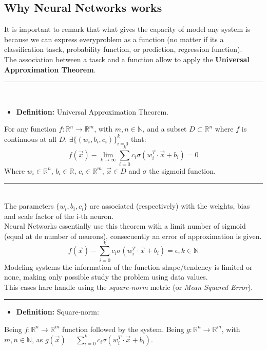 \documentclass[a4paper, 11pt]{article}
\begin{document}
\subsection{Why Neural Networks works}
It is important to remark that what gives the capacity of model any system is because we can express everyproblem as a function (no matter if its a classification tasck, probability function, or prediction, regression function).\\
The association between a tasck and a function allow to apply the \textbf{Universal Approximation Theorem}.\\
\rule{\linewidth}{0.4pt}\\
\begin{itemize}
    \item \textbf{Definition:} Universal Approximation Theorem.
\end{itemize}  
For any function $f:\mathbb{R}^n \rightarrow \mathbb{R}^m$, with $m,n\in\mathbb{N}$, and a subset $D\subset \mathbb{R}^n$ where $f$ is continuous at all $D$, 
$\exists \{(w_i, b_i, c_i)\}_{i = 0}^k$ that: 
$$f(\vec{x}) - \lim_{k \rightarrow \infty} \sum_{i=0}^{k} c_i \sigma \left( w_i^T \cdot \vec{x} + b_i \right) = 0$$
Where $w_i \in \mathbb{R}^n$, $b_i\in \mathbb{R}$, $c_i \in \mathbb{R}^m$, $\vec{x}\in D$ and $\sigma$ the sigmoid function.\\
\rule{\linewidth}{0.4pt}\\\vspace{0.5em}
The parameters $\{w_i, b_i, c_i\}$ are associated (respectively) with the weights, bias and scale factor of the i-th neuron.\\
Neural Networks essentially use this theorem with a limit number of sigmoid (equal at de number of neurons), consecuently an error of approximation is given.
$$f(\vec{x})-\sum_{i=0}^{k} c_i \sigma \left( w_i^T \cdot \vec{x} + b_i \right) = \epsilon, k \in \mathbb{N}$$
Modeling systems the information of the function shape/tendency is limited or none, making only possible study the problem using data values.\\
This cases hare handle using the \textit{square-norm} metric (or \textit{Mean Squared Error}).\\
\rule{\linewidth}{0.4pt}
\begin{itemize}
    \item \textbf{Definition:} Square-norm: 
\end{itemize}
Being $f:\mathbb{R}^n \rightarrow \mathbb{R}^m$ function followed by the system.
Being $g:\mathbb{R}^n \rightarrow \mathbb{R}^m$, with $m,n\in\mathbb{N}$, as $g(\vec{x}) = \sum_{i=0}^{k} c_i \sigma \left( w_i^T \cdot \vec{x} + b_i \right)$.\\
\end{document}
